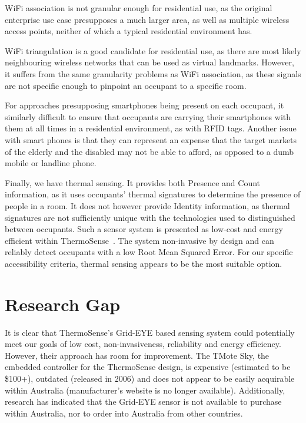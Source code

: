 \documentclass[../thesis/thesis.tex]{subfiles}
\begin{document}
WiFi association is not granular enough for residential use, as the original enterprise use case presupposes a much larger area, as well as multiple wireless access points, neither of which a typical residential environment has.

WiFi triangulation is a good candidate for residential use, as there are most likely neighbouring wireless networks that can be used as virtual landmarks. However, it suffers from the same granularity problems as WiFi association, as these signals are not specific enough to pinpoint an occupant to a specific room.

For approaches presupposing smartphones being present on each occupant, it similarly difficult to ensure that occupants are carrying their smartphones with them at all times in a residential environment, as with RFID tags.  Another issue with smart phones is that they can represent an expense that the target markets of the elderly and the disabled may not be able to afford, as opposed to a dumb mobile or landline phone.

Finally, we have thermal sensing. It provides both Presence and Count information, as it uses occupants' thermal signatures to determine the presence of people in a room. It does not however provide Identity information, as thermal signatures are not sufficiently unique with the technologies used to distinguished between occupants. Such a sensor system is presented as low-cost and energy efficient within ThermoSense~\cite{beltran2013thermosense}. The system non-invasive by design and can reliably detect occupants with a low Root Mean Squared Error. For our specific accessibility criteria, thermal sensing appears to be the most suitable option.

\section{Research Gap}
It is clear that ThermoSense's Grid-EYE based sensing system could potentially meet our goals of low cost, non-invasiveness, reliability and energy efficiency. However, their approach has room for improvement. The TMote Sky, the embedded controller for the ThermoSense design, is expensive (estimated to be \$100+), outdated (released in 2006) and does not appear to be easily acquirable within Australia (manufacturer's website is no longer available). Additionally, research has indicated that the Grid-EYE sensor is not available to purchase within Australia, nor to order into Australia from other countries.
\end{document}
